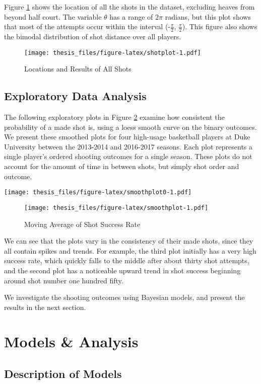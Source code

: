 \documentclass[12pt,twoside]{dukestatscithesis}
\theoremstyle{definition}
\theoremstyle{definition}
\theoremstyle{definition}
\theoremstyle{remark}
\begin{document}
Figure \ref{fig:shotplot} shows the location of all the shots in the
dataset, excluding heaves from beyond half court. The variable
\(\theta\) has a range of \(2\pi\) radians, but this plot shows that
most of the attempts occur within the interval (-\(\frac{\pi}{2}\),
\(\frac{\pi}{2}\)). This figure also shows the bimodal distribution of
shot distance over all players.
\begin{figure}[htbp]
\centering
\texttt{[image: thesis\_files/figure-latex/shotplot-1.pdf]}
\caption{\label{fig:shotplot}Locations and Results of All Shots}
\end{figure}
\section{Exploratory Data Analysis}\label{exploratory-data-analysis}

The following exploratory plots in Figure \ref{fig:smoothplot} examine
how consistent the probability of a made shot is, using a loess smooth
curve on the binary outcomes. We present these smoothed plots for four
high-usage basketball players at Duke University between the 2013-2014
and 2016-2017 seasons. Each plot represents a single player's ordered
shooting outcomes for a single season. These plots do not account for
the amount of time in between shots, but simply shot order and outcome.

\texttt{[image: thesis\_files/figure-latex/smoothplot0-1.pdf]}
\begin{figure}[htbp]
\centering
\texttt{[image: thesis\_files/figure-latex/smoothplot-1.pdf]}
\caption{\label{fig:smoothplot}Moving Average of Shot Success Rate}
\end{figure}
We can see that the plots vary in the consistency of their made shots,
since they all contain spikes and trends. For example, the third plot
initially has a very high success rate, which quickly falls to the
middle after about thirty shot attempts, and the second plot has a
noticeable upward trend in shot success beginning around shot number one
hundred fifty.

We investigate the shooting outcomes using Bayesian models, and present
the results in the next section.

\chapter{Models \& Analysis}\label{models}

\section{Description of Models}\label{description-of-models}
\end{document}
